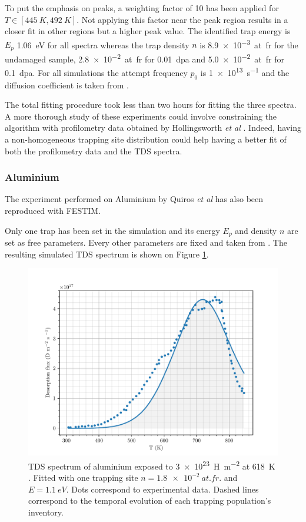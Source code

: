 To put the emphasis on peaks, a weighting factor of 10 has been applied for $T \in [\SI{445}{K}, \SI{492}{K}]$.
Not applying this factor near the peak region results in a closer fit in other regions but a higher peak value.
The identified trap energy is $E_p$ \SI{1.06}{eV} for all spectra whereas the trap density $n$ is \SI{8.9e-3}{at.fr} for the undamaged sample, \SI{2.8e-2}{at.fr} for \SI{0.01}{dpa} and \newline \SI{5.0e-2}{at.fr} for \SI{0.1}{dpa}.
For all simulations the attempt frequency $p_0$ is \SI{1e13}{s^{-1}} and the diffusion coefficient is taken from .

The total fitting procedure took less than two hours for fitting the three spectra.
A more thorough study of these experiments could involve constraining the algorithm with profilometry data obtained by Hollingsworth \textit{et al} \cite{hollingsworth_comparative_2019}.
Indeed, having a non-homogeneous trapping site distribution could help having a better fit of both the profilometry data and the TDS spectra. 

\subsubsection{Aluminium}

The experiment performed on Aluminium by Quiros \textit{et al}  has also been reproduced with FESTIM.

Only one trap has been set in the simulation and its energy $E_p$ and density $n$ are set as free parameters.
Every other parameters are fixed and taken from \cite{quiros_blister_2017, quiros_blistering_2019}.
The resulting simulated TDS spectrum is shown on Figure \ref{fig:TDS alu}.
\begin{figure} [h!]
    \centering
    \includegraphics[width=0.9\linewidth]{Figures/Chapter3/Parametric_optimisation/alu_quiros.pdf}
    \caption{TDS spectrum of aluminium exposed to \SI{3e23}{H.m^{-2}} at \SI{618}{K} \cite{quiros_blister_2017, quiros_blistering_2019}. Fitted with one trapping site $n = \SI{1.8e-2}{at.fr.}$ and $E =\SI{1.1}{eV}$. Dots correspond to experimental data. Dashed lines correspond to the temporal evolution of each trapping population's inventory.}
    \label{fig:TDS alu}
\end{figure}


